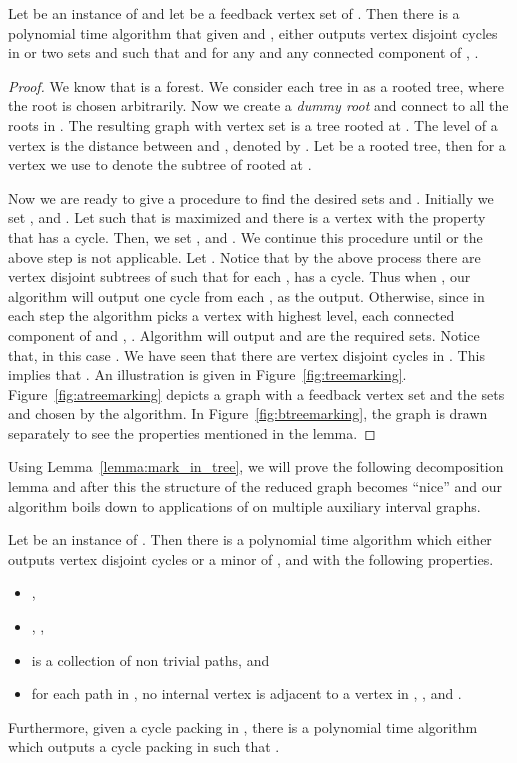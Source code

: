 \begin{lemma}
\label{lemma:mark_in_tree}
Let  be an instance of \CP{} and let  be a feedback vertex set of . Then there is 
a polynomial time algorithm  that given  and , either outputs  
vertex disjoint cycles in  or two sets  and  such that 
  and  for any  and any connected component  of , 
. 
\end{lemma}
\begin{proof}
We know that  is a forest. We consider each tree in  as a rooted tree, where the root is chosen arbitrarily. Now we create a 
{\em dummy root } and connect to all the roots in . The resulting graph  with vertex set  is 
a tree rooted at . The level of a vertex  is the distance between  and , denoted by . Let  be a rooted tree, then for a vertex   
we use  to denote the subtree of  rooted at .  

Now we are ready to give a procedure to find the desired sets 
 and . Initially we set ,  and . Let  such that 
 is maximized and there is a vertex  with the property that  has a cycle.  
Then, we set ,  and . We continue this procedure until  
or the above step is not applicable. Let .
Notice that by the above process there are vertex disjoint subtrees 
 of   such that for each ,  has a cycle. 
Thus when , our algorithm 
 will output one cycle from each ,  as the output. Otherwise, since in each step the 
algorithm picks a vertex with highest level, each connected component  of  and ,  
. 
Algorithm  will output 
 and  are the required sets. Notice that, in this case . We have seen that there are  vertex disjoint cycles in . This implies that   .  An illustration is given in Figure~\ref{fig:treemarking}.  Figure~\ref{fig:atreemarking} depicts a graph  with a feedback vertex set  and 
the sets  and  chosen by the algorithm. In Figure~\ref{fig:btreemarking}, the graph  is drawn separately 
to see the properties mentioned in the lemma.  
 
\end{proof}

Using Lemma~\ref{lemma:mark_in_tree}, we will prove the following decomposition lemma and after this the structure of the reduced graph becomes ``nice'' and our algorithm boils down to applications of \shortULI{} on multiple auxiliary interval graphs.  


\begin{lemma}
\label{lem:CP_path_creation}
Let  be an instance of \CP. Then there is a polynomial time algorithm  which either 
outputs  vertex disjoint cycles or 
a minor  of , and  with the following properties.
\begin{itemize}
\setlength{\itemsep}{-2pt}
\item[] , 
\item[] , , 
\item[]  is a  collection  of   non trivial paths, and 
\item[] for each path  in , no internal vertex is adjacent to a vertex in , \;
, and .
\end{itemize}
Furthermore, given a cycle packing  in , there is a polynomial time algorithm  which 
outputs a cycle packing  in  such that . 
\end{lemma}

